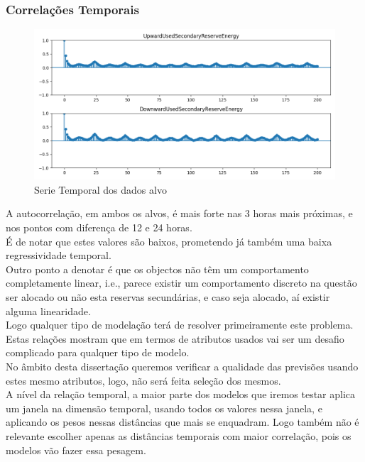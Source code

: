 \subsubsection{Correlações Temporais}

\begin{figure}[H]
  \centering
  \includegraphics[width=\textwidth]{plots/autocorrelation.png}
  \caption{Serie Temporal dos dados alvo}
  \label{fig:autocorrelation}
\end{figure}

A autocorrelação, em ambos os alvos, é mais forte nas 3 horas mais próximas, e nos pontos com diferença de 12 e 24 horas. \\
É de notar que estes valores são baixos, prometendo já também uma baixa regressividade temporal. \\
Outro ponto a denotar é que os objectos não têm um comportamento completamente linear, i.e., parece existir um comportamento discreto na questão ser alocado ou não esta reservas secundárias, e caso seja alocado, aí existir alguma linearidade. \\
Logo qualquer tipo de modelação terá de resolver primeiramente este problema. \\
Estas relações mostram que em termos de atributos usados vai ser um desafio complicado para qualquer tipo de modelo. \\
No âmbito desta dissertação queremos verificar a qualidade das previsões usando estes mesmo atributos, logo, não será feita seleção dos mesmos. \\
A nível da relação temporal, a maior parte dos modelos que iremos testar aplica um janela na dimensão temporal, usando todos os valores nessa janela, e aplicando os pesos nessas distâncias que mais se enquadram. Logo também não é relevante escolher apenas as distâncias temporais com maior correlação, pois os modelos vão fazer essa pesagem. \\


